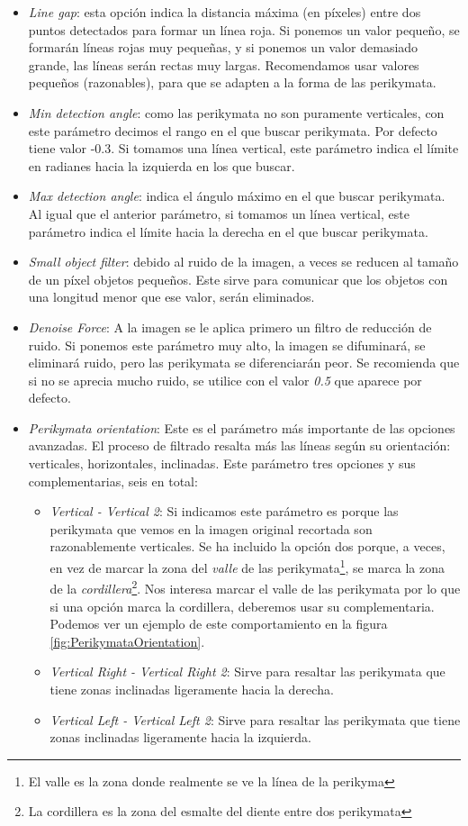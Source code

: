 \begin{itemize}
    \item \textit{Line gap}: esta opción indica la distancia máxima (en píxeles) entre dos puntos detectados para formar un línea roja. Si ponemos un valor pequeño, se formarán líneas rojas muy pequeñas, y si ponemos un valor demasiado grande, las líneas serán rectas muy largas. Recomendamos usar valores pequeños (razonables), para que se adapten a la forma de las perikymata.
    \item \textit{Min detection angle}: como las perikymata no son puramente verticales, con este parámetro decimos el rango en el que buscar perikymata. Por defecto tiene valor -0.3. Si tomamos una línea vertical, este parámetro indica el límite en radianes hacia la izquierda en los que buscar.
    \item \textit{Max detection angle}: indica el ángulo máximo en el que buscar perikymata. Al igual que el anterior parámetro, si tomamos un línea vertical, este parámetro indica el límite hacia la derecha en el que buscar perikymata.
    \item \textit{Small object filter}: debido al ruido de la imagen, a veces se reducen al tamaño de un píxel objetos pequeños. Este sirve para comunicar que los objetos con una longitud menor que ese valor, serán eliminados.
    \item \textit{Denoise Force}: A la imagen se le aplica primero un filtro de reducción de ruido. Si ponemos este parámetro muy alto, la imagen se difuminará, se eliminará ruido, pero las perikymata se diferenciarán peor. Se recomienda que si no se aprecia mucho ruido, se utilice con el valor \textit{0.5} que aparece por defecto.
    \item \textit{Perikymata orientation}: Este es el parámetro más importante de las opciones avanzadas. El proceso de filtrado resalta más las líneas según su orientación: verticales, horizontales, inclinadas. Este parámetro tres opciones y sus complementarias, seis en total: 
    \begin{itemize}
        \item \textit{Vertical - Vertical 2}: Si indicamos este parámetro es porque las perikymata que vemos en la imagen original recortada son razonablemente verticales. Se ha incluido la opción dos porque, a veces, en vez de marcar la zona del \textit{valle} de las perikymata\footnote{El valle es la zona donde realmente se ve la línea de la perikyma}, se marca la zona de la \textit{cordillera}\footnote{La cordillera es la zona del esmalte del diente entre dos perikymata}. Nos interesa marcar el valle de las perikymata por lo que si una opción marca la cordillera, deberemos usar su complementaria. Podemos ver un ejemplo de este comportamiento en la figura \ref{fig:PerikymataOrientation}.
        \item \textit{Vertical Right - Vertical Right 2}: Sirve para resaltar las perikymata que tiene zonas inclinadas ligeramente hacia la derecha.
        \item \textit{Vertical Left - Vertical Left 2}: Sirve para resaltar las perikymata que tiene zonas inclinadas ligeramente hacia la izquierda.
    \end{itemize}
\end{itemize}

